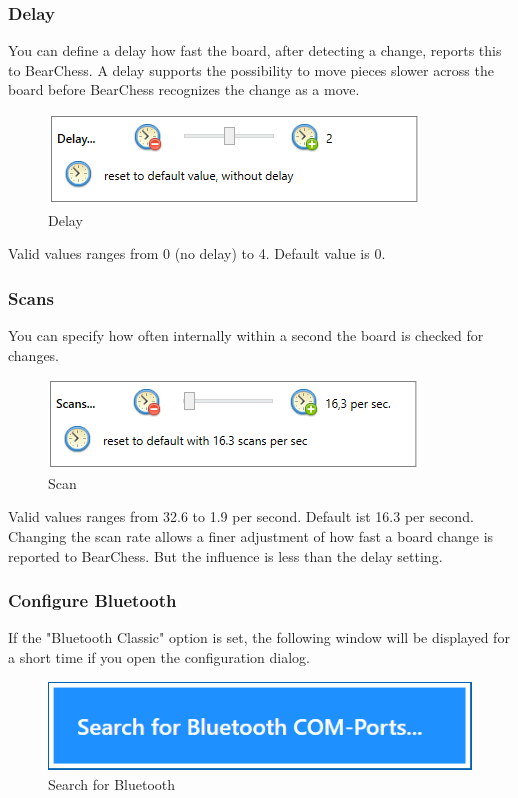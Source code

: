\documentclass[11pt,a4paper]{article}
\begin{document}
\subsubsection{Delay}
You can define a delay how fast the board, after detecting a change, reports this to BearChess. A delay supports the possibility to move pieces slower across the board before BearChess recognizes the change as a move. \\
\begin{figure}[H]
	\centering
	\includegraphics[scale=1.0]{MillenniumChessLink11.png}
	\caption{Delay}
	\label{fig:MillenniumChessLink11}
\end{figure}
Valid values ranges from 0 (no delay) to 4. Default value is 0.


\subsubsection{Scans}
You can specify how often internally within a second the board is checked for changes.\\
\begin{figure}[H]
	\centering
	\includegraphics[scale=1.0]{MillenniumChessLink12.png}
	\caption{Scan}
	\label{fig:MillenniumChessLink12}
\end{figure}
Valid values ranges from 32.6 to 1.9 per second. Default ist 16.3 per second.
Changing the scan rate allows a finer adjustment of how fast a board change is reported to BearChess. But the influence is less than the delay setting.


\subsubsection{Configure Bluetooth} \label{Bluetooth}

If the "Bluetooth Classic" option is set, the following window will be displayed for a short time if you open the configuration dialog.

\begin{figure}[H]
	\centering
	\includegraphics[scale=0.8]{MillenniumChessLink10.png}
	\caption{Search for Bluetooth}
	\label{fig:MillenniumChessLink10}
\end{figure}
\end{document}
